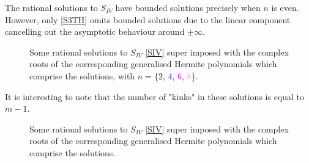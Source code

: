 \documentclass[12pt]{article}
\numberwithin{figure}{section}
\numberwithin{equation}{section}
\numberwithin{table}{section}
\begin{document}
The rational solutions to $S_{IV}$ have bounded solutions precisely when $n$ is even. However, only \eqref{S3TH} omits bounded solutions due to the linear component cancelling out the asymptotic behaviour around $\pm\infty$.
\begin{figure}[H]
\centering
{}
\caption{Some rational solutions to $S_{IV}$ \eqref{SIV} super imposed with the complex roots of the corresponding generalised Hermite polynomials which comprise the solutions, with $n=\{$\textcolor{black}{2}, \textcolor{blue}{4}, \textcolor{magenta}{6}, \textcolor{Plum}{8}\}.}
\end{figure}
It is interesting to note that the number of "kinks" in these solutions is equal to $m-1$.
\begin{figure}[H]
\centering
{}
\caption{Some rational solutions to $S_{IV}$ \eqref{SIV} super imposed with the complex roots of the corresponding generalised Hermite polynomials which comprise the solutions.}
\end{figure}
\end{document}
